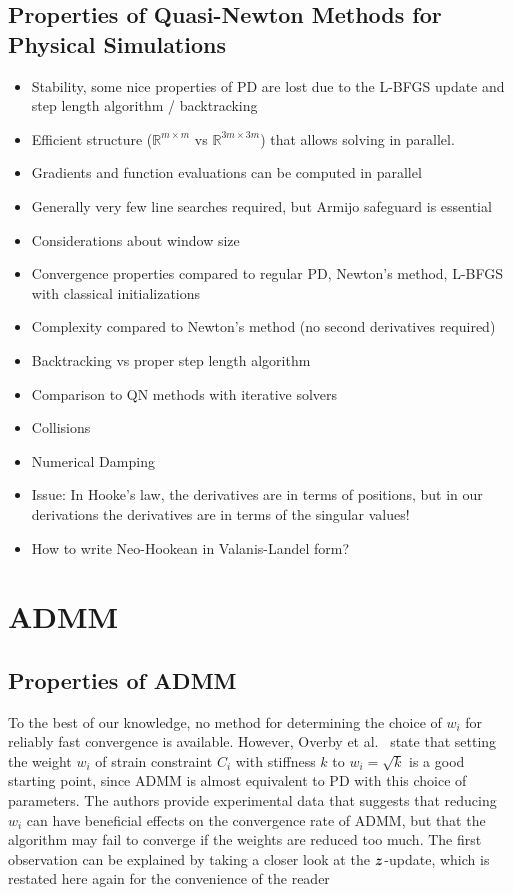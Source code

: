 \subsection{Properties of Quasi-Newton Methods for Physical Simulations}\label{ss:properties-qn}
\begin{itemize}
    \item Stability, some nice properties of PD are lost due to the L-BFGS update and step length algorithm / backtracking
    \item Efficient structure ($\mathbb{R}^{m \times m}$ vs $\mathbb{R}^{3m \times 3m}$) that allows solving in parallel.
    \item Gradients and function evaluations can be computed in parallel
    \item Generally very few line searches required, but Armijo safeguard is essential
    \item Considerations about window size
    \item Convergence properties compared to regular PD, Newton's method, L-BFGS with classical initializations
    \item Complexity compared to Newton's method (no second derivatives required)
    \item Backtracking vs proper step length algorithm 
    \item Comparison to QN methods with iterative solvers
    \item Collisions
    \item Numerical Damping
    \item Issue: In Hooke's law, the derivatives are in terms of positions, but in our derivations the derivatives are in terms of the 
        singular values!
    \item How to write Neo-Hookean in Valanis-Landel form?
\end{itemize}

\section{ADMM}\label{s:admm}
\subsection{Properties of ADMM}\label{ss:admm-properties}
To the best of our knowledge, no method for determining the choice of $w_i$ for reliably fast convergence is available.
However, Overby et al.\ \cite{overby2017} state that setting the weight $w_i$ of strain constraint $C_i$ with stiffness $k$ to $w_i = \sqrt{k}$ is a good starting point, since 
ADMM is almost equivalent to PD with this choice of parameters. The authors provide experimental data that suggests 
that reducing $w_i$ can have beneficial effects on the convergence rate of ADMM, but that the algorithm may fail to converge if 
the weights are reduced too much. The first observation can be explained by taking a closer look at the $\bm{z}$-update, which is restated here again 
for the convenience of the reader

